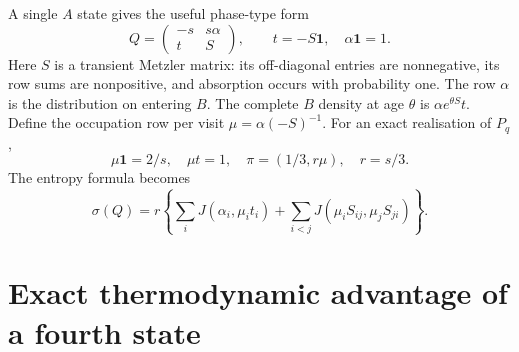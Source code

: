 \documentclass[11pt,a4paper]{article}
\theoremstyle{remark}\newtheorem{remark}[theorem]{Remark}
\newcommand{\one}{\mathbf 1}
\begin{document}
A single $A$ state gives the useful phase-type form
\begin{equation}\label{eq:reset}
 Q=\begin{pmatrix}-s&s\alpha\\t&S\end{pmatrix},\qquad
 t=-S\one,\quad \alpha\one=1.
\end{equation}
Here $S$ is a transient Metzler matrix: its off-diagonal entries are
nonnegative, its row sums are nonpositive, and absorption occurs with
probability one. The row $\alpha$ is the distribution on entering $B$.
The complete $B$ density at age $\theta$ is $\alpha e^{\theta S}t$. Define the occupation row per
visit $\mu=\alpha(-S)^{-1}$. For an exact realisation of $P_q$,
\begin{equation}\label{eq:occupation}
 \mu\one=2/s,\quad \mu t=1,\quad
 \pi=(1/3,r\mu),\quad r=s/3.
\end{equation}
The entropy formula becomes
\begin{equation}\label{eq:phasecost}
 \sigma(Q)=r\left\{\sum_iJ(\alpha_i,\mu_it_i)
       +\sum_{i<j}J(\mu_iS_{ij},\mu_jS_{ji})\right\}.
\end{equation}

\section{Exact thermodynamic advantage of a fourth state}
\label{sec:main}
\end{document}
